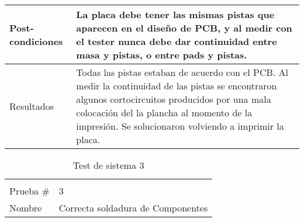 \begin{table}[h]
\begin{tabular}{p{2cm} p{9cm}}
Post-condiciones & La placa debe tener las mismas pistas que aparecen en el diseño de PCB, y al medir con el tester nunca debe dar continuidad entre masa y pistas, o entre pads y pistas.  
\\ 
\hline
Resultados       & Todas las pistas estaban de acuerdo con el PCB. Al medir la continuidad de las pistas se encontraron algunos cortocircuitos producidos por una mala colocación del la plancha al momento de la impresión. Se solucionaron volviendo a imprimir la placa.                                                                                                                                                   
\end{tabular}
\end{table}

\begin{table}[h]
\centering
\caption{Test de sistema 3}
\label{it3:tab:testsistema3}
\begin{tabular}{p{2cm} p{9cm}}
\multicolumn{2}{c}{\cellcolor[HTML]{68CBD0}{\color[HTML]{000000} Prueba de sistema}}                                                                                                                                                                                                                                                   \\
Prueba \#        & 3                                                                                                                                                                                                                                                                                                                   \\
\hline
Nombre           & Correcta soldadura de Componentes                                                                   \\             


\end{tabular}
\end{table}
